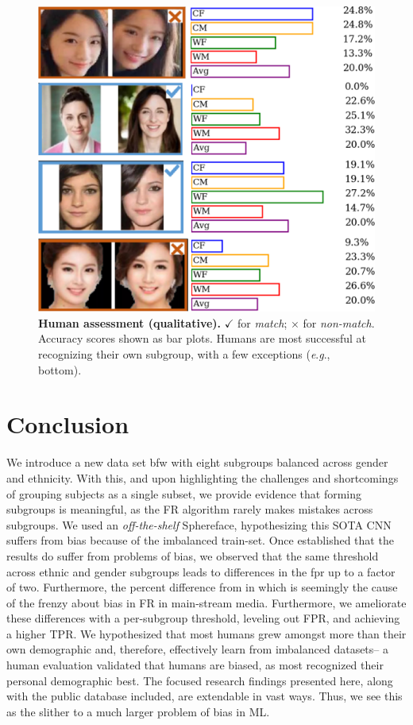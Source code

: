 \documentclass[10pt,twocolumn,letterpaper]{article}
\newcommand{\eg}{\textit{e}.\textit{g}., }
\begin{document}



\begin{figure}[t!] 
	\centering    
	\includegraphics[width=.55\linewidth] {figures/human_eval.pdf}
		\caption{\small{\textbf{Human assessment (qualitative).} $\checkmark$ for \emph{match}; $\times$ for \emph{non-match}. Accuracy scores shown as bar plots. Humans are most successful at recognizing their own subgroup, with a few exceptions (\eg bottom).}}
		\label{fig:human-eval} 
\end{figure} 


\glsresetall
\section{Conclusion}
We introduce a new data set \gls{bfw} with eight subgroups balanced across gender and ethnicity. With this, and upon highlighting the challenges and shortcomings of grouping subjects as a single subset, we provide evidence that forming subgroups is meaningful, as the FR algorithm rarely makes mistakes across subgroups. We used an \textit{off-the-shelf} Sphereface, hypothesizing this SOTA CNN suffers from bias because of the imbalanced train-set. Once established that the results do suffer from problems of bias, we observed that the same threshold across ethnic and gender subgroups leads to differences in the \gls{fpr} up to a factor of two. Furthermore, the percent difference from in which is seemingly the cause of the frenzy about bias in FR in main-stream media. Furthermore, we ameliorate these differences with a per-subgroup threshold, leveling out FPR, and achieving a higher TPR. We hypothesized that most humans grew amongst more than their own demographic and, therefore, effectively learn from imbalanced datasets-- a human evaluation validated that humans are biased, as most recognized their personal demographic best. The focused research findings presented here, along with the public database included, are extendable in vast ways. Thus, we see this as the slither to a much larger problem of bias in ML.



{\small


}

% 
\end{document}
